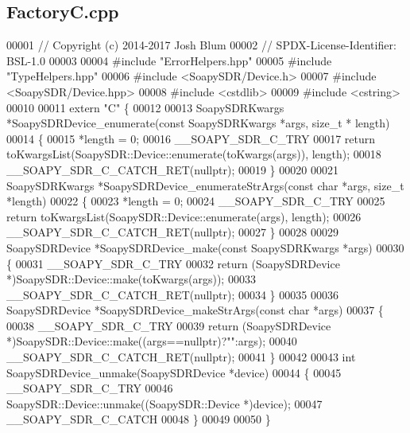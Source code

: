 \subsection{Factory\+C.\+cpp}
\label{FactoryC_8cpp_source}

\begin{DoxyCode}
00001 \textcolor{comment}{// Copyright (c) 2014-2017 Josh Blum}
00002 \textcolor{comment}{// SPDX-License-Identifier: BSL-1.0}
00003 
00004 \textcolor{preprocessor}{#include "ErrorHelpers.hpp"}
00005 \textcolor{preprocessor}{#include "TypeHelpers.hpp"}
00006 \textcolor{preprocessor}{#include <SoapySDR/Device.h>}
00007 \textcolor{preprocessor}{#include <SoapySDR/Device.hpp>}
00008 \textcolor{preprocessor}{#include <cstdlib>}
00009 \textcolor{preprocessor}{#include <cstring>}
00010 
00011 \textcolor{keyword}{extern} \textcolor{stringliteral}{"C"} \{
00012 
00013 SoapySDRKwargs *SoapySDRDevice_enumerate(\textcolor{keyword}{const} SoapySDRKwargs *args, \textcolor{keywordtype}{size\_t} *
      length)
00014 \{
00015     *length = 0;
00016     __SOAPY_SDR_C_TRY
00017     \textcolor{keywordflow}{return} toKwargsList(SoapySDR::Device::enumerate(toKwargs(args)), length);
00018     __SOAPY_SDR_C_CATCH_RET(\textcolor{keyword}{nullptr});
00019 \}
00020 
00021 SoapySDRKwargs *SoapySDRDevice_enumerateStrArgs(\textcolor{keyword}{const} \textcolor{keywordtype}{char} *args, \textcolor{keywordtype}{size\_t} *length)
00022 \{
00023     *length = 0;
00024     __SOAPY_SDR_C_TRY
00025     \textcolor{keywordflow}{return} toKwargsList(SoapySDR::Device::enumerate(args), length);
00026     __SOAPY_SDR_C_CATCH_RET(\textcolor{keyword}{nullptr});
00027 \}
00028 
00029 SoapySDRDevice *SoapySDRDevice_make(\textcolor{keyword}{const} SoapySDRKwargs *args)
00030 \{
00031     __SOAPY_SDR_C_TRY
00032     \textcolor{keywordflow}{return} (SoapySDRDevice *)SoapySDR::Device::make(toKwargs(args));
00033     __SOAPY_SDR_C_CATCH_RET(\textcolor{keyword}{nullptr});
00034 \}
00035 
00036 SoapySDRDevice *SoapySDRDevice_makeStrArgs(\textcolor{keyword}{const} \textcolor{keywordtype}{char} *args)
00037 \{
00038     __SOAPY_SDR_C_TRY
00039     \textcolor{keywordflow}{return} (SoapySDRDevice *)SoapySDR::Device::make((args==\textcolor{keyword}{nullptr})?\textcolor{stringliteral}{""}:args);
00040     __SOAPY_SDR_C_CATCH_RET(\textcolor{keyword}{nullptr});
00041 \}
00042 
00043 \textcolor{keywordtype}{int} SoapySDRDevice_unmake(SoapySDRDevice *device)
00044 \{
00045     __SOAPY_SDR_C_TRY
00046     SoapySDR::Device::unmake((SoapySDR::Device *)device);
00047     __SOAPY_SDR_C_CATCH
00048 \}
00049 
00050 \}
\end{DoxyCode}
